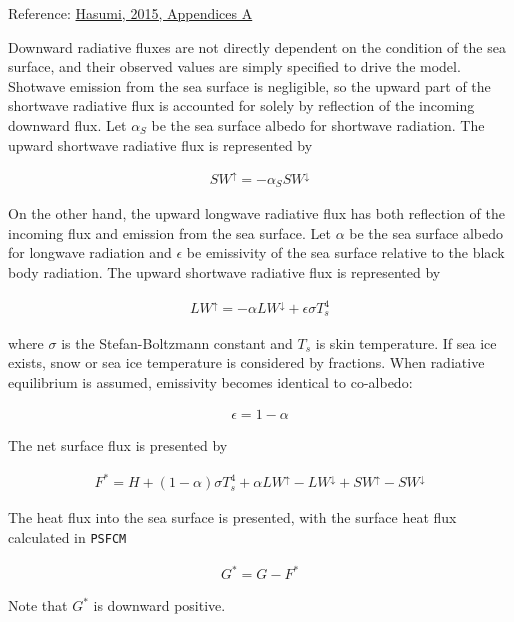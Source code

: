 Reference:
\href{https://ccsr.aori.u-tokyo.ac.jp/~hasumi/COCO/coco4.pdf}{Hasumi,
2015, Appendices A}

Downward radiative fluxes are not directly dependent on the condition of
the sea surface, and their observed values are simply specified to drive
the model. Shotwave emission from the sea surface is negligible, so the
upward part of the shortwave radiative flux is accounted for solely by
reflection of the incoming downward flux. Let \(\alpha _S\) be the sea
surface albedo for shortwave radiation. The upward shortwave radiative
flux is represented by

\begin{eqnarray}
    SW^\uparrow = - \alpha_S SW^\downarrow
\end{eqnarray}

On the other hand, the upward longwave radiative flux has both
reflection of the incoming flux and emission from the sea surface. Let
\(\alpha\) be the sea surface albedo for longwave radiation and
\(\epsilon\) be emissivity of the sea surface relative to the black body
radiation. The upward shortwave radiative flux is represented by

\begin{eqnarray}
    LW^\uparrow = - \alpha LW^\downarrow + \epsilon \sigma T_s ^4
\end{eqnarray}

where \(\sigma\) is the Stefan-Boltzmann constant and \(T_s\) is skin
temperature. If sea ice exists, snow or sea ice temperature is
considered by fractions. When radiative equilibrium is assumed,
emissivity becomes identical to co-albedo:

\begin{eqnarray}
    \epsilon = 1 - \alpha
\end{eqnarray}

The net surface flux is presented by

\begin{eqnarray}
    F^*=H + (1-\alpha)\sigma T_s^4 + \alpha LW^\uparrow - LW^\downarrow +SW^\uparrow - SW^\downarrow        
\end{eqnarray}

The heat flux into the sea surface is presented, with the surface heat
flux calculated in \texttt{PSFCM}

\begin{eqnarray}
    G^* = G - F^*
\end{eqnarray}

Note that \(G^*\) is downward positive.

